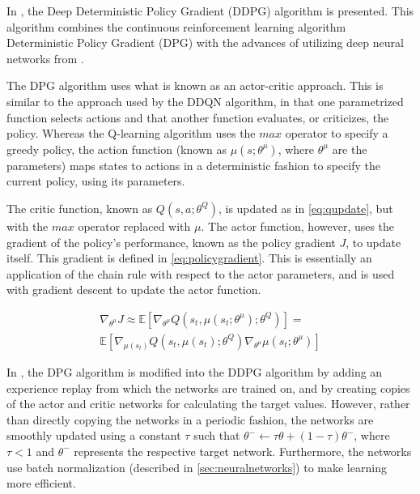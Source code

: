 \documentclass{kththesis}
\begin{document}
In \parencite{lillicrap2015continuous}, the Deep Deterministic Policy Gradient (DDPG) algorithm is presented. This algorithm combines the continuous reinforcement learning algorithm Deterministic Policy Gradient (DPG) with the advances of utilizing deep neural networks from \parencite{mnih2015human}.

The DPG algorithm uses what is known as an actor-critic approach. This is similar to the approach used by the DDQN algorithm, in that one parametrized function selects actions and that another function evaluates, or criticizes, the policy. Whereas the Q-learning algorithm uses the $max$ operator to specify a greedy policy, the action function (known as $\mu(s;\theta^\mu)$, where $\theta^\mu$ are the parameters) maps states to actions in a deterministic fashion to specify the current policy, using its parameters. 

The critic function, known as $Q(s, a; \theta^Q)$, is updated as in \autoref{eq:qupdate}, but with the $max$ operator replaced with $\mu$. The actor function, however, uses the gradient of the policy's performance, known as the policy gradient $J$, to update itself. This gradient is defined in \autoref{eq:policygradient}. This is essentially an application of the chain rule with respect to the actor parameters, and is used with gradient descent to update the actor function. \parencite{lillicrap2015continuous}

\begin{equation}
\label{eq:policygradient}
\begin{split}
\nabla_{\theta^\mu}J \approx \mathbb{E}[\nabla_{\theta^\mu}Q(s_t, \mu(s_t;\theta^\mu); \theta^Q)] = \\ \mathbb{E}[\nabla_{\mu(s_t)}Q(s_t, \mu(s_t); \theta^Q)\nabla_{\theta^\mu}\mu(s_t; \theta^\mu)]
\end{split}
\end{equation}

In \parencite{lillicrap2015continuous}, the DPG algorithm is modified into the DDPG algorithm by adding an experience replay from which the networks are trained on, and by creating copies of the actor and critic networks for calculating the target values. However, rather than directly copying the networks in a periodic fashion, the networks are smoothly updated using a constant $\tau$ such that $\theta^- \leftarrow \tau\theta + (1-\tau)\theta^-$, where $\tau < 1$ and $\theta^-$ represents the respective target network. Furthermore, the networks use batch normalization (described in \autoref{sec:neuralnetworks}) to make learning more efficient. 
\end{document}
